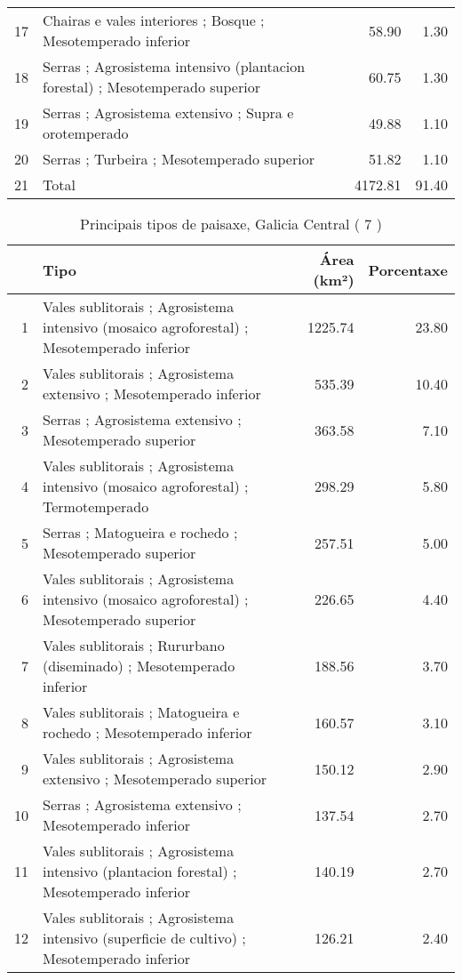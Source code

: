 \begin{table}[p]
\begin{tabular}{rlrr}
  17 & Chairas e vales interiores ; Bosque ; Mesotemperado inferior & 58.90 & 1.30 \\ 
  18 & Serras ; Agrosistema intensivo (plantacion forestal) ; Mesotemperado superior & 60.75 & 1.30 \\ 
  19 & Serras ; Agrosistema extensivo ; Supra e orotemperado & 49.88 & 1.10 \\ 
  20 & Serras ; Turbeira ; Mesotemperado superior & 51.82 & 1.10 \\ 
  21 & Total & 4172.81 & 91.40 \\ 
   \hline
\end{tabular}
\end{table}
\begin{table}[p]
\centering
\caption{Principais tipos de paisaxe,  Galicia Central ( 7 )} 
\label{Tipos 7}
\begin{tabular}{rlrr}
  \hline
 & Tipo & Área (km²) & Porcentaxe \\ 
  \hline
1 & Vales sublitorais ; Agrosistema intensivo (mosaico agroforestal) ; Mesotemperado inferior & 1225.74 & 23.80 \\ 
  2 & Vales sublitorais ; Agrosistema extensivo ; Mesotemperado inferior & 535.39 & 10.40 \\ 
  3 & Serras ; Agrosistema extensivo ; Mesotemperado superior & 363.58 & 7.10 \\ 
  4 & Vales sublitorais ; Agrosistema intensivo (mosaico agroforestal) ; Termotemperado & 298.29 & 5.80 \\ 
  5 & Serras ; Matogueira e rochedo ; Mesotemperado superior & 257.51 & 5.00 \\ 
  6 & Vales sublitorais ; Agrosistema intensivo (mosaico agroforestal) ; Mesotemperado superior & 226.65 & 4.40 \\ 
  7 & Vales sublitorais ; Rururbano (diseminado) ; Mesotemperado inferior & 188.56 & 3.70 \\ 
  8 & Vales sublitorais ; Matogueira e rochedo ; Mesotemperado inferior & 160.57 & 3.10 \\ 
  9 & Vales sublitorais ; Agrosistema extensivo ; Mesotemperado superior & 150.12 & 2.90 \\ 
  10 & Serras ; Agrosistema extensivo ; Mesotemperado inferior & 137.54 & 2.70 \\ 
  11 & Vales sublitorais ; Agrosistema intensivo (plantacion forestal) ; Mesotemperado inferior & 140.19 & 2.70 \\ 
  12 & Vales sublitorais ; Agrosistema intensivo (superficie de cultivo) ; Mesotemperado inferior & 126.21 & 2.40 \\ 

\end{tabular}
\end{table}

